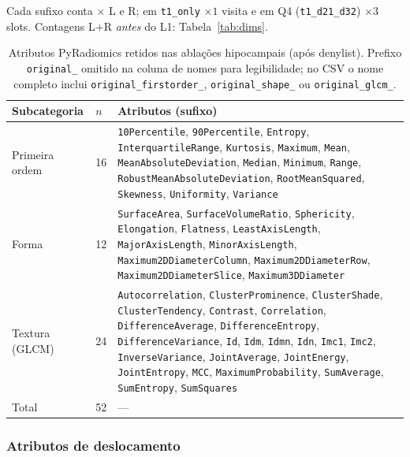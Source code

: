 \documentclass[review]{elsarticle}
\newcommand{\code}[1]{\texttt{#1}}
\begin{document}
			Cada sufixo conta $\times$ L e R; em \code{t1\_only} $\times 1$ visita e em Q4 (\code{t1\_d21\_d32}) $\times 3$ slots.
			Contagens L$+$R \emph{antes} do L1: Tabela~\ref{tab:dims}.
			
			\begin{table}[htbp]
				\centering
				\caption{Atributos PyRadiomics retidos nas ablações hipocampais (após denylist). Prefixo \code{original\_} omitido na coluna de nomes para legibilidade; no CSV o nome completo inclui \code{original\_firstorder\_}, \code{original\_shape\_} ou \code{original\_glcm\_}.}
				\label{tab:pyradiomics-features}
				\small
					\begin{tabular}{@{}llp{}@{}}
						\toprule
						Subcategoria & $n$ & Atributos (sufixo) \\
						\midrule
						Primeira ordem
						& 16
						& \code{10Percentile}, \code{90Percentile}, \code{Entropy}, \code{InterquartileRange},
						\code{Kurtosis}, \code{Maximum}, \code{Mean}, \code{MeanAbsoluteDeviation},
						\code{Median}, \code{Minimum}, \code{Range}, \code{RobustMeanAbsoluteDeviation},
						\code{RootMeanSquared}, \code{Skewness}, \code{Uniformity}, \code{Variance} \\
						\addlinespace
						Forma
						& 12
						& \code{SurfaceArea}, \code{SurfaceVolumeRatio}, \code{Sphericity}, \code{Elongation},
						\code{Flatness}, \code{LeastAxisLength}, \code{MajorAxisLength}, \code{MinorAxisLength},
						\code{Maximum2DDiameterColumn}, \code{Maximum2DDiameterRow},
						\code{Maximum2DDiameterSlice}, \code{Maximum3DDiameter} \\
						\addlinespace
						Textura (GLCM)
						& 24
						& \code{Autocorrelation}, \code{ClusterProminence}, \code{ClusterShade},
						\code{ClusterTendency}, \code{Contrast}, \code{Correlation},
						\code{DifferenceAverage}, \code{DifferenceEntropy}, \code{DifferenceVariance},
						\code{Id}, \code{Idm}, \code{Idmn}, \code{Idn}, \code{Imc1}, \code{Imc2},
						\code{InverseVariance}, \code{JointAverage}, \code{JointEnergy},
						\code{JointEntropy}, \code{MCC}, \code{MaximumProbability},
						\code{SumAverage}, \code{SumEntropy}, \code{SumSquares} \\
						\midrule
						Total
						& 52
						& --- \\
						\bottomrule
					\end{tabular}
			\end{table}

		\subsubsection{Atributos de deslocamento}\label{sec:displacement-features}
\end{document}
